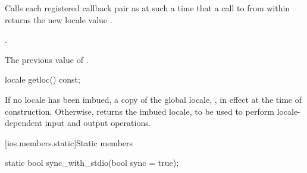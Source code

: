 \begin{itemdescr}
\pnum
\effects
Calls each registered callback pair
as
at such a time that a call to
from within
returns the new locale value
.

\pnum
\ensures
{}.

\pnum
\returns
The previous value of
.
\end{itemdescr}

%
\begin{itemdecl}
locale getloc() const;
\end{itemdecl}

\begin{itemdescr}
\pnum
\returns
If no locale has been imbued, a copy of the global \Cpp{} locale,
,
in effect at the time of construction.
Otherwise, returns the imbued locale, to be used to
perform locale-dependent input and output operations.
\end{itemdescr}

[ios.members.static]{Static members}

%
\begin{itemdecl}
static bool sync_with_stdio(bool sync = true);
\end{itemdecl}

